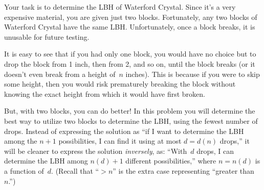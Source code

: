 \documentclass[11pt,addpoints]{exam}
\begin{document}
\begin{questions}
  Your task is to determine the LBH of Waterford Crystal.
  Since it's a very expensive material, you are given just two blocks.
  Fortunately, any two blocks of Waterford Crystal have the same LBH\@.
  Unfortunately, once a block breaks, it is unusable for future testing.
 
  It is easy to see that if you had only one block, you would have no choice but to drop the block from 1 inch, then from 2, and so on, until the block breaks (or it doesn't even break from a height of~$n$ inches).
  This is because if you were to skip some height, then you would risk prematurely breaking the block without knowing the exact height from which it would have first broken.

  But, with two blocks, you can do better!
  In this problem you will determine the best way to utilize two blocks to determine the LBH, using the fewest number of drops.
  Instead of expressing the solution as ``if I want to determine the LBH among the $n+1$ possibilities, I can find it using at most $d=d(n)$ drops,'' it will be cleaner to express the solution \emph{inversely}, as: ``With~$d$ drops, I can determine the LBH among $n(d)+1$ different possibilities,'' where $n=n(d)$ is a function of~$d$.
  (Recall that ``$> n$'' is the extra case representing ``greater than~$n$.'')

\end{questions}
\end{document}
